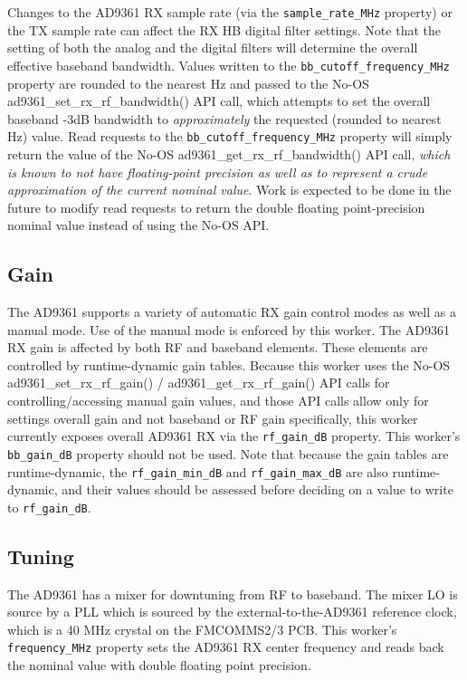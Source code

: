 \documentclass{article}
\begin{document}
Changes to the AD9361 RX sample rate (via the \verb+sample_rate_MHz+ property) or the TX sample rate can affect the RX HB digital filter settings. Note that the setting of both the analog and the digital filters will determine the overall effective baseband bandwidth. Values written to the \verb+bb_cutoff_frequency_MHz+ property are rounded to the nearest Hz and passed to the No-OS ad9361\_set\_rx\_rf\_bandwidth() API call, which attempts to set the overall baseband -3dB bandwidth to \textit{approximately} the requested (rounded to nearest Hz) value. Read requests to the \verb+bb_cutoff_frequency_MHz+ property will simply return the value of the No-OS ad9361\_get\_rx\_rf\_bandwidth() API call, \textit{which is known to not have floating-point precision as well as to represent a crude approximation of the current nominal value}. Work is expected to be done in the future to modify read requests to return the double floating point-precision nominal value instead of using the No-OS API.
\subsection*{Gain}
The AD9361 supports a variety of automatic RX gain control modes as well as a manual mode. Use of the manual mode is enforced by this worker. The AD9361 RX gain is affected by both RF and baseband elements. These elements are controlled by runtime-dynamic gain tables. Because this worker uses the No-OS ad9361\_set\_rx\_rf\_gain() / ad9361\_get\_rx\_rf\_gain() API calls for controlling/accessing manual gain values, and those API calls allow only for settings overall gain and not baseband or RF gain specifically, this worker currently exposes overall AD9361 RX via the \verb+rf_gain_dB+ property. This worker's \verb+bb_gain_dB+ property should not be used. Note that because the gain tables are runtime-dynamic, the \verb+rf_gain_min_dB+ and \verb+rf_gain_max_dB+ are also runtime-dynamic, and their values should be assessed before deciding on a value to write to \verb+rf_gain_dB+.
\subsection*{Tuning}
The AD9361 has a mixer for downtuning from RF to baseband. The mixer LO is source by a PLL which is sourced by the external-to-the-AD9361 reference clock, which is a 40 MHz crystal on the FMCOMMS2/3 PCB. This worker's \verb+frequency_MHz+ property sets the AD9361 RX center frequency and reads back the nominal value with double floating point precision.
\end{document}
